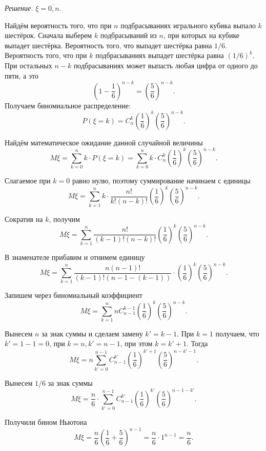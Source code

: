\textit{Решение.} $ \xi = \overline{0, n}$.

Найдём вероятность того, что при $n$ подбрасываниях игрального кубика выпало $k$ шестёрок.
Сначала выберем $k$ подбрасываний из $n$, при которых на кубике выпадет шестёрка.
Вероятность того, что выпадет шестёрка равна $1/6$.
Вероятность того, что при $k$ подбрасываниях выпадет шестёрка равна $ \left( 1/6 \right)^k$.
При остальных $n - k$ подбрасываниях может выпасть любая цифра от одного до пяти, а это
$$ \left( 1 - \frac{1}{6} \right)^{n-k} =
\left( \frac{5}{6} \right)^{n-k}.$$
Получаем биномиальное распределение:
$$P \left( \xi = k \right) =
C_n^k \left( \frac{1}{6} \right)^k \left( \frac{5}{6} \right)^{n-k}.$$

Найдём математическое ожидание данной случайной величины
$$M \xi =
\sum \limits_{k=0}^n k \cdot P \left( \xi = k \right) =
\sum \limits_{k=0}^n k \cdot C_n^k \left( \frac{1}{6} \right)^k \left( \frac{5}{6} \right)^{n-k}.$$

Слагаемое при $k = 0$ равно нулю, поэтому суммирование начинаем с единицы
$$M \xi =
\sum \limits_{k=1}^n k \cdot \frac{n!}{k! \left( n-k \right)!} \left( \frac{1}{6} \right)^k \left( \frac{5}{6} \right)^{n-k}.$$

Сократив на $k$, получим
$$M \xi =
\sum \limits_{k=1}^n \frac{n!}{ \left( k-1 \right)! \left( n-k \right)! } \left( \frac{1}{6} \right)^k \left( \frac{5}{6} \right)^{n-k}.$$

В знаменателе прибавим и отнимем единицу
$$M \xi =
\sum \limits_{k=1}^n \frac{n \left( n-1 \right)!}{ \left( k-1 \right)! \left( n - 1 - \left( k-1 \right) \right) } \cdot
\left( \frac{1}{6} \right)^k \left( \frac{5}{6} \right)^{n-k}.$$

Запишем через биномиальный коэффициент
$$M \xi =
\sum \limits_{k=1}^n nC_{n-1}^{k-1} \left( \frac{1}{6} \right)^k \left( \frac{5}{6} \right)^{n-k}.$$

Вынесем $n$ за знак суммы и сделаем замену $k' = k - 1$.
При $k = 1$ получаем, что $k' = 1 - 1 = 0$, при $k = n, k' = n - 1$, при этом $k = k' + 1$.
Тогда
$$M \xi =
n \sum \limits_{k'=0}^{n-1} C_{n-1}^{k'} \left( \frac{1}{6} \right)^{k'+1} \left( \frac{5}{6} \right)^{n-k'-1}.$$

Вынесем $1/6$ за знак суммы
$$M \xi =
\frac{n}{6} \cdot \sum \limits_{k'=0}^{n-1} C_{n-1}^{k'} \left( \frac{1}{6} \right)^{k'} \left( \frac{5}{6} \right)^{n-1-k'}.$$

Получили бином Ньютона
$$M \xi =
\frac{n}{6} \left( \frac{1}{6} + \frac{5}{6} \right)^{n-1} =
\frac{n}{6} \cdot 1^{n-1} =
\frac{n}{6}.$$

